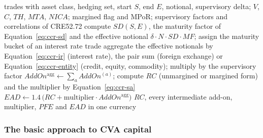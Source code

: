 \begin{algorithm}[htbp]
\caption{The SA-CCR exposure at default of a netting set from its trades (engine \texttt{regulatory.sa\_ccr}, cases of C12 and CRE99).}
\label{alg:ccr-saccr}
\begin{algorithmic}[1]
\Require trades with asset class, hedging set, start $S$, end $E$, notional, supervisory delta; $V$, $C$, $TH$, $MTA$, $NICA$; margined flag and MPoR; supervisory factors and correlations of CRE52.72
  \State compute $SD(S,E)$, the maturity factor of Equation~\ref{eq:ccr-sd} and the effective notional $\delta\cdot N\cdot SD\cdot MF$; assign the maturity bucket of an interest rate trade
\EndFor
{}
  \State aggregate the effective notionals by Equation~\ref{eq:ccr-ir} (interest rate), the pair sum (foreign exchange) or Equation~\ref{eq:ccr-entity} (credit, equity, commodity); multiply by the supervisory factor
\EndFor
\State $AddOn^{\mathrm{agg}}\leftarrow\sum_a AddOn^{(a)}$; compute $RC$ (unmargined or margined form) and the multiplier by Equation~\ref{eq:ccr-sa}
\State $EAD\leftarrow1.4\,\big(RC+\text{multiplier}\cdot AddOn^{\mathrm{agg}}\big)$
\Ensure $RC$, every intermediate add-on, multiplier, $PFE$ and $EAD$ in one currency
\end{algorithmic}
\end{algorithm}

\subsubsection{The basic approach to CVA capital}


